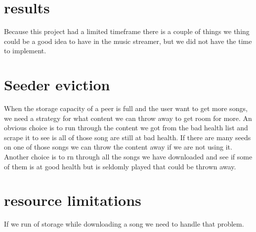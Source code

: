 \section{results}

Because this project had a limited timeframe there is a couple of things we thing could be a good idea to have in the 
music streamer, but we did not have the time to implement.

\section{Seeder eviction}
When the storage capacity of a peer is full and the user want to get more songs, we need a strategy for what content we can throw away to get room for more.
An obvious choice is to run through the content we got from the bad health list and scrape it to see is all of those song are still at bad health. If there are many seeds on one of those songs we can throw the content away if we are not using it.
Another choice is to rn through all the songs we have downloaded and see if some of them is at good health but is seldomly played that could be thrown away.

\section{resource limitations}
If we run of storage while downloading a song we need to handle that problem.


